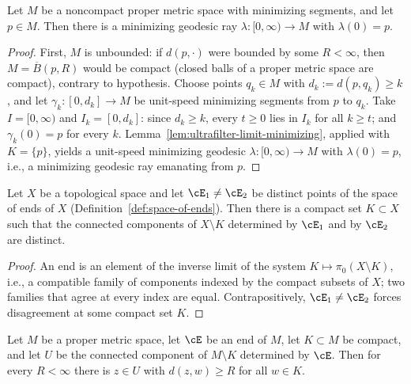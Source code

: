 \begin{lemma}
\label{lem:ray-exists-metric}
\leanok
{}
Let $M$ be a noncompact proper metric space with minimizing
segments, and let $p\in M$. Then there is a minimizing geodesic ray
$\lambda\colon[0,\infty)\to M$ with $\lambda(0)=p$.
\end{lemma}

\begin{proof}
\leanok
{}
First, $M$ is unbounded: if $d(p,\cdot)$ were bounded by some
$R<\infty$, then $M=\overline{B}(p,R)$ would be compact (closed
balls of a proper metric space are compact), contrary to hypothesis.
Choose points $q_k\in M$ with $d_k:=d(p,q_k)\ge k$, and let
$\gamma_k\colon[0,d_k]\to M$ be unit-speed minimizing segments from
$p$ to $q_k$. Take $I=[0,\infty)$ and $I_k=[0,d_k]$: since $d_k\ge
k$, every $t\ge0$ lies in $I_k$ for all $k\ge t$; and
$\gamma_k(0)=p$ for every $k$.
Lemma~\ref{lem:ultrafilter-limit-minimizing}, applied with
$K=\{p\}$, yields a unit-speed minimizing geodesic
$\lambda\colon[0,\infty)\to M$ with $\lambda(0)=p$, i.e., a
minimizing geodesic ray emanating from $p$.
\end{proof}

\begin{lemma}
\label{lem:ends-differ-at-compact}
\leanok
{}
Let $X$ be a topological space and let $\cE_1\neq\cE_2$ be distinct
points of the space of ends of $X$
(Definition~\ref{def:space-of-ends}). Then there is a compact set
$K\subset X$ such that the connected components of $X\setminus K$
determined by $\cE_1$ and by $\cE_2$ are distinct.
\end{lemma}

\begin{proof}
\leanok
An end is an element of the inverse limit of the system $K\mapsto
\pi_0(X\setminus K)$, i.e., a compatible family of components
indexed by the compact subsets of $X$; two families that agree at
every index are equal. Contrapositively, $\cE_1\neq\cE_2$ forces
disagreement at some compact set $K$.
\end{proof}

\begin{lemma}
\label{lem:end-component-unbounded}
\leanok
{}
Let $M$ be a proper metric space, let $\cE$ be an end of $M$, let
$K\subset M$ be compact, and let $U$ be the connected component of
$M\setminus K$ determined by $\cE$. Then for every $R<\infty$ there
is $z\in U$ with $d(z,w)\ge R$ for all $w\in K$.
\end{lemma}

